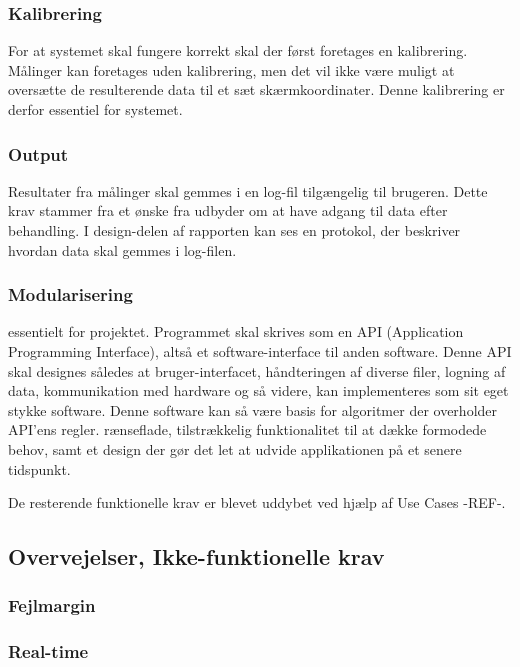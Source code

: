 \documentclass[rapport.tex]{subfiles}
\begin{document}
	
	\subsubsection{Kalibrering}
	For at systemet skal fungere korrekt skal der først foretages en kalibrering.
	Målinger kan foretages uden kalibrering, men det vil ikke være muligt at oversætte de resulterende data til et sæt skærmkoordinater. Denne kalibrering er derfor essentiel for systemet.
	
	
	\subsubsection{Output}
	Resultater fra målinger skal gemmes i en log-fil tilgængelig til brugeren. Dette krav stammer fra et ønske fra udbyder om at have adgang til data efter behandling. I
	design-delen af rapporten kan ses en protokol, der beskriver hvordan data skal gemmes i log-filen. 
	
	\subsubsection{Modularisering}
 essentielt for projektet. Programmet skal skrives som en API (Application Programming Interface), altså et software-interface til anden software. Denne API skal designes således at bruger-interfacet, håndteringen af diverse filer, logning af data, kommunikation med hardware og så videre, kan implementeres som sit eget stykke software. Denne software kan så være basis for algoritmer der overholder API'ens regler. 
rænseflade, tilstrækkelig
	funktionalitet til at dække formodede behov, samt et design der gør det let at udvide
	applikationen på et senere tidspunkt.
	
	De resterende funktionelle krav er blevet uddybet ved hjælp af Use Cases -REF-.
	
	
	\subsection{Overvejelser, Ikke-funktionelle krav}
	
	\subsubsection{Fejlmargin}
	
	
	
	\subsubsection{Real-time}
	
\end{document}
